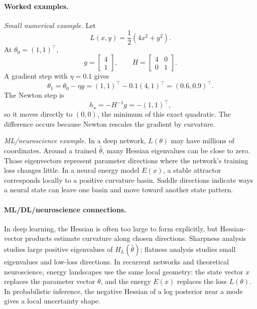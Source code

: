 \paragraph{Worked examples.}
\emph{Small numerical example.} Let
\[
L(x,y)=\frac{1}{2}(4x^2+y^2).
\]
At \(\theta_0=(1,1)^\top\),
\[
g=
\begin{bmatrix}
4\\
1
\end{bmatrix},
\qquad
H=
\begin{bmatrix}
4&0\\
0&1
\end{bmatrix}.
\]
A gradient step with \(\eta=0.1\) gives
\[
\theta_1=\theta_0-\eta g=(1,1)^\top-0.1(4,1)^\top=(0.6,0.9)^\top.
\]
The Newton step is
\[
h_\star=-H^{-1}g=-(1,1)^\top,
\]
so it moves directly to \((0,0)\), the minimum of this exact quadratic. The difference occurs because Newton rescales the gradient by curvature.

\emph{ML/neuroscience example.} In a deep network, \(L(\theta)\) may have millions of coordinates. Around a trained \(\hat{\theta}\), many Hessian eigenvalues can be close to zero. Those eigenvectors represent parameter directions where the network's training loss changes little. In a neural energy model \(E(x)\), a stable attractor corresponds locally to a positive curvature basin. Saddle directions indicate ways a neural state can leave one basin and move toward another state pattern.

\paragraph{ML/DL/neuroscience connections.}
In deep learning, the Hessian is often too large to form explicitly, but Hessian-vector products estimate curvature along chosen directions. Sharpness analysis studies large positive eigenvalues of \(H_L(\hat{\theta})\); flatness analysis studies small eigenvalues and low-loss directions. In recurrent networks and theoretical neuroscience, energy landscapes use the same local geometry: the state vector \(x\) replaces the parameter vector \(\theta\), and the energy \(E(x)\) replaces the loss \(L(\theta)\). In probabilistic inference, the negative Hessian of a log posterior near a mode gives a local uncertainty shape.

